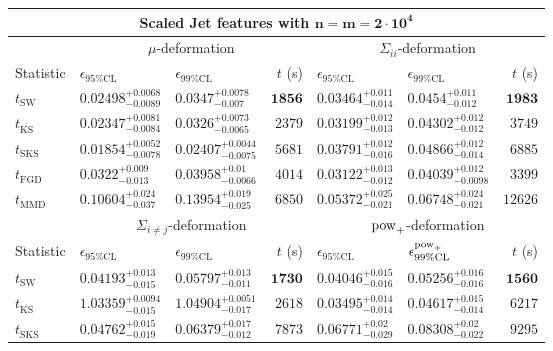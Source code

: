 \begin{tabular}{l|llr|llr}
	\toprule
	\multicolumn{7}{c}{{\bf Scaled Jet features with $\mathbf{n=m=2\cdot 10^{4}}$}} \\
	\toprule
	\multicolumn{1}{c}{} & \multicolumn{3}{c}{$\mu$-deformation} & \multicolumn{3}{c}{$\Sigma_{ii}$-deformation} \\
	Statistic & $\epsilon_{95\%\mathrm{CL}}$ & $\epsilon_{99\%\mathrm    {CL}}$ & $t$ (s) & $\epsilon_{95\%\mathrm{CL}}$ & $\epsilon_{99\%\mathrm{CL}}$ & $t$ (s) \\
	\midrule
	$t_{\mathrm{SW}}$ & $0.02498_{-0.0089}^{+0.0068}$ & $0.0347_{-0.007}^{+0.0078}$ & ${\mathbf{1856}}$ & $0.03464_{-0.014}^{+0.011}$ & $0.0454_{-0.012}^{+0.011}$ & ${\mathbf{1983}}$ \\
	$t_{\overline{\mathrm{KS}}}$ & $0.02347_{-0.0084}^{+0.0081}$ & $0.0326_{-0.0065}^{+0.0073}$ & $2379$ & $0.03199_{-0.013}^{+0.012}$ & $0.04302_{-0.012}^{+0.012}$ & $3749$ \\
	$t_{\mathrm{SKS}}$ & ${\mathbf{0.01854_{-0.0078}^{+0.0052}}}$ & ${\mathbf{0.02407_{-0.0075}^{+0.0044}}}$ & $5681$ & $0.03791_{-0.016}^{+0.012}$ & $0.04866_{-0.014}^{+0.012}$ & $6885$ \\
	$t_{\mathrm{FGD}}$ & $0.0322_{-0.013}^{+0.009}$ & $0.03958_{-0.0066}^{+0.01}$ & $4014$ & ${\mathbf{0.03122_{-0.012}^{+0.013}}}$ & ${\mathbf{0.04039_{-0.0098}^{+0.012}}}$ & $3399$ \\
	$t_{\mathrm{MMD}}$ & $0.10604_{-0.037}^{+0.024}$ & $0.13954_{-0.025}^{+0.019}$ & $6850$ & $0.05372_{-0.021}^{+0.025}$ & $0.06748_{-0.021}^{+0.024}$ & $12626$ \\
	\toprule
	\multicolumn{1}{c}{} & \multicolumn{3}{c}{$\Sigma_{i\neq j}$-deformation} & \multicolumn{3}{c}{$\rm{pow}_{+}$-deformation} \\
	Statistic & $\epsilon_{95\%\mathrm{CL}}$ & $\epsilon_{99\%\mathrm{CL}}$ & $t$ (s) & $\epsilon_{95\%\mathrm{CL}}$ & $\epsilon^{\rm   {pow}_{+}}_{99\%\mathrm{CL}}$ & $t$ (s) \\
	\midrule
	$t_{\mathrm{SW}}$ & $0.04193_{-0.015}^{+0.013}$ & $0.05797_{-0.011}^{+0.013}$ & ${\mathbf{1730}}$ & $0.04046_{-0.016}^{+0.015}$ & $0.05256_{-0.016}^{+0.016}$ & ${\mathbf{1560}}$ \\
	$t_{\overline{\mathrm{KS}}}$ & $1.03359_{-0.015}^{+0.0094}$ & $1.04904_{-0.017}^{+0.0051}$ & $2618$ & $0.03495_{-0.014}^{+0.014}$ & $0.04617_{-0.014}^{+0.015}$ & $6217$ \\
	$t_{\mathrm{SKS}}$ & $0.04762_{-0.019}^{+0.015}$ & $0.06379_{-0.012}^{+0.017}$ & $7873$ & $0.06771_{-0.029}^{+0.02}$ & $0.08308_{-0.022}^{+0.02}$ & $9295$ \\

\end{tabular}
